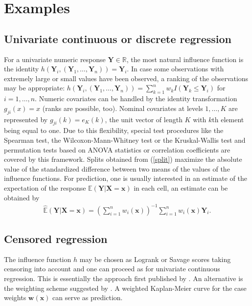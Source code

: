\documentclass{Z}
\renewcommand{\E}{\mathbb{E}}
\newcommand{\R}{\mathbb{R} }
\newcommand{\X}{\mathbf{X}}
\newcommand{\Y}{\mathbf{Y}}
\newcommand{\x}{\mathbf{x}}
\newcommand{\w}{\mathbf{w}}
\begin{document}
\clearpage

\section{Examples} \label{examples}

\subsection{Univariate continuous or discrete regression}

For a univariate numeric response $\Y \in \R$, the most natural influence function
is the identity $h(\Y_i, (\Y_1, \dots, \Y_n)) = \Y_i$. 
In case some observations with extremely large or small values have been
observed, a
ranking of the observations may be appropriate:
$h(\Y_i, (\Y_1, \dots, \Y_n)) = \sum_{k=1}^n w_k I(\Y_k \le \Y_i)$ for $i = 1, \dots,
n$.
Numeric covariates can be handled by the identity transformation 
$g_{ji}(x) = x$ (ranks are possible, too). Nominal covariates at levels $1,
\dots, K$ are
represented by $g_{ji}(k) = e_K(k)$, the unit vector of length $K$ with
$k$th element being equal to one. Due to this flexibility, special test 
procedures like the Spearman test, the 
Wilcoxon-Mann-Whitney test or the Kruskal-Wallis test and permutation tests
based on ANOVA statistics or correlation coefficients
are covered by this framework. Splits obtained from (\ref{split}) maximize the
absolute value of the standardized difference between two means of the
values of the influence functions. 
For prediction, one is usually interested in an estimate of 
the expectation of
the response $\E(\Y | \X = \x)$ in each cell, an estimate can be 
obtained by 
\begin{eqnarray*}
\hat{\E}(\Y | \X = \x) = \left(\sum_{i=1}^n w_i(\x)\right)^{-1} \sum_{i=1}^n
w_i(\x) \Y_i.
\end{eqnarray*}

\subsection{Censored regression}

The influence function $h$ may be chosen as 
Logrank or Savage scores taking censoring into
account and one can proceed as for univariate continuous regression. This is
essentially the approach first published by \cite{regression:1988}. 
An alternative is the weighting scheme suggested by
\cite{MolinaroDudiotvdLaan2003}. A weighted Kaplan-Meier curve for the case
weights $\w(\x)$ can serve as prediction. 
\end{document}
